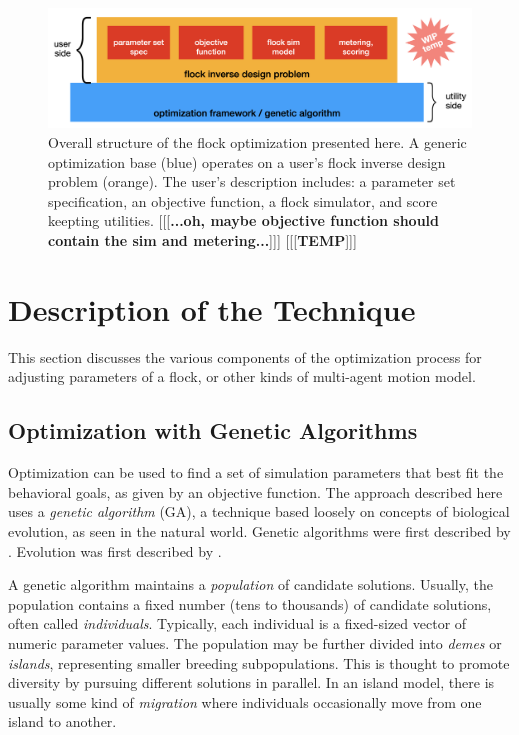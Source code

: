 \documentclass[letterpaper]{article}
\begin{document}

\begin{figure}[t]
    \centering
    \includegraphics[width=0.9\linewidth]{images/temp_system_blocks.png}
    \caption{Overall structure of the flock optimization presented here. A generic optimization base (blue) operates on a user's flock inverse design problem (orange). The user's description includes: a parameter set specification, an objective function, a flock simulator, and score keepting utilities. [[[\textbf{...oh, maybe objective function should contain the sim and metering...}]]] [[[\textbf{TEMP}]]]}
    \label{fig:system_blocks}
\end{figure}


\section{Description of the Technique}
\label{sec:Description}

This section discusses the various components of the optimization process for adjusting parameters of a flock, or other kinds of multi-agent motion model.


\subsection{Optimization with Genetic Algorithms}
\label{subsec:Optimization_with_GA}

Optimization can be used to find a set of simulation parameters that best fit the behavioral goals, as given by an objective function. The approach described here uses a \textit{genetic algorithm} (GA), a technique based loosely on concepts of biological evolution, as seen in the natural world. Genetic algorithms were first described by \citet{holland_adaptation_1975}. Evolution was first described by \citet{darwin_origin_1859}.

A genetic algorithm maintains a \textit{population} of candidate solutions. Usually, the population contains a fixed number (tens to thousands) of candidate solutions, often called \textit{individuals}. Typically, each individual is a fixed-sized vector of numeric parameter values. The population may be further divided into \textit{demes} or \textit{islands}, representing smaller breeding subpopulations. This is thought to promote diversity by pursuing different solutions in parallel. In an island model, there is usually some kind of \textit{migration} where individuals occasionally move from one island to another.
\end{document}
